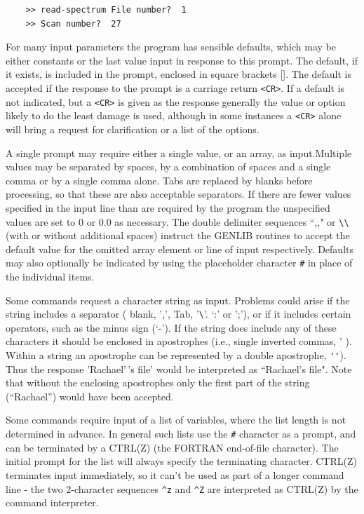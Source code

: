 \documentclass[11pt,twoside]{report}
\begin{document}
\begin{verbatim}
    >> read-spectrum File number?  1
    >> Scan number?  27
\end{verbatim}

For many input parameters the program has sensible
defaults, which may be either constants or the last
value input in response to this prompt. The default, if it exists, is
included in the prompt, enclosed in square brackets []. The default is
accepted if the response to the prompt is a carriage return
\verb+<CR>+. If a default is not indicated, but a \verb+<CR>+ is given
as the response generally the value or option likely to do the least
damage is used, although in some instances a \verb+<CR>+ alone will
bring a request for clarification or a list of the options.

A single prompt may require either a single value, or an array, as
input.Multiple values may be separated by spaces, by
a combination of spaces and a single comma or by a single comma
alone. Tabs are replaced by blanks before processing, so
that these are also acceptable separators. If there are fewer values
specified in the input line than are required by the program the
unspecified values are set to 0 or 0.0
as necessary. The double delimiter sequences
``,," or \verb+\\+ (with or without additional spaces) instruct the
GENLIB routines to accept the default value for the
omitted array element or line of input respectively. Defaults may also
optionally be indicated by using the placeholder character
\verb+#+ in place of the individual items.

Some commands request a character string as
input.  Problems could arise if the string includes a separator (
blank, ',', Tab, '\verb+\+'. `:' or ';'), or if it includes certain
operators, such as the minus sign (`-'). If the string does include
any of these characters it should be enclosed in apostrophes (i.e.,
single inverted commas, ' ). Within a string an apostrophe can be
represented by a double apostrophe,
\verb+''+). Thus the response 'Rachael'\,'s file' would be interpreted
as ``Rachael's file". Note that without the enclosing apostrophes only
the first part of the string (``Rachael'') would have been accepted.

Some commands require input of a list of
variables, where the list length is not determined in advance. In
general such lists use the
\verb+#+ character as a prompt, and can be
terminated by a CTRL(Z) (the FORTRAN end-of-file
character). The initial prompt for the list will always specify the
terminating character. CTRL(Z) terminates input immediately, so it
can't be used as part of a longer command line - the two 2-character
sequences \verb+^z+ and \verb+^Z+ are interpreted as CTRL(Z) by the
command interpreter.
\end{document}
